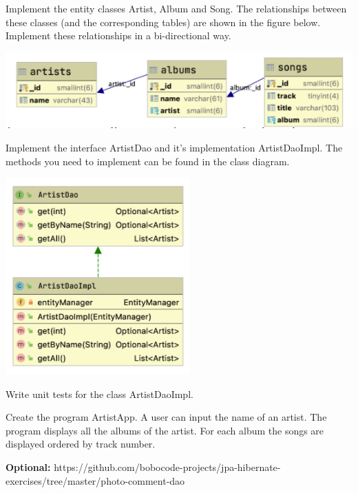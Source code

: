 \begin{oefening}
Implement the entity classes Artist, Album and Song. The relationships between these classes (and the corresponding tables) are shown in the figure below.  Implement these relationships in a bi-directional way.

\includegraphics[width=\textwidth]{./images/chapter6/exercise-schema}

Implement the interface ArtistDao and it's implementation ArtistDaoImpl. The methods you need to implement can be found in the class diagram.

\includegraphics{./images/chapter6/exercise-dao}

Write unit tests for the class ArtistDaoImpl.

Create the program ArtistApp. A user can input the name of an artist. The program displays all the albums of the artist. For each album the songs are displayed ordered by track number.
\end{oefening}


\begin{oefening}
\textbf{Optional:} 
https://github.com/bobocode-projects/jpa-hibernate-exercises/tree/master/photo-comment-dao
\end{oefening}